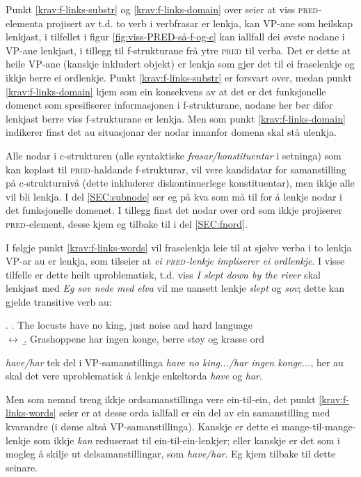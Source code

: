 \documentclass[11pt,a4paper,oneside,draft]{book}
\newcommand{\F}[2]{\textsc{#1}\ensuremath{_{#2}}}
\newcommand{\PRED}{\F{pred}{}}
\begin{document}
Punkt \ref{krav:f-links-substr} og \ref{krav:f-links-domain} over seier at viss
\PRED{}-elementa projisert av t.d. to verb i verbfrasar er lenkja, kan
VP-ane som heilskap lenkjast, i tilfellet i figur
\ref{fig:viss-PRED-så-f-og-c} kan iallfall dei øvste nodane i VP-ane
lenkjast, i tillegg til f-strukturane frå ytre \PRED{} til verba.  Det er
dette at heile VP-ane (kanskje inkludert objekt) er lenkja som gjer
det til ei fraselenkje og ikkje berre ei ordlenkje. Punkt
\ref{krav:f-links-substr} er forsvart over, medan punkt
\ref{krav:f-links-domain} kjem som ein konsekvens av at det er det
funksjonelle domenet som spesifiserer informasjonen i f-strukturane,
nodane her bør difor lenkjast berre viss f-strukturane er lenkja. Men
som punkt \ref{krav:f-links-domain} indikerer finst det au situasjonar der
nodar innanfor domena skal stå ulenkja.

Alle nodar i c-strukturen (alle syntaktiske \emph{frasar/konstituentar} i
setninga) som kan koplast til \PRED{}-haldande f-strukturar, vil vere
kandidatar for samanstilling på c-strukturnivå (dette inkluderer
diskontinuerlege konstituentar), men ikkje alle vil bli lenkja.  I del
\ref{SEC:subnode} ser eg på kva som må til for å lenkje nodar i det
funksjonelle domenet.  I tillegg finst det nodar over ord som ikkje
projiserer \PRED{}-element, desse kjem eg tilbake til i del
\ref{SEC:fnord}.

I følgje punkt \ref{krav:f-links-words} vil fraselenkja leie til at sjølve
verba i to lenkja VP-ar au er lenkja, som tilseier at \emph{ei \PRED{}-lenkje
impliserer ei ordlenkje}. I visse tilfelle er dette heilt
uproblematisk, t.d. viss \emph{I slept down by the river} skal lenkjast med
\emph{Eg sov nede med elva} vil me uansett lenkje \emph{slept} og \emph{sov}; dette
kan gjelde transitive verb au:

\ex. \a. The locusts have no king, just noise and hard language\\
     $\leftrightarrow$
     \b. Grashoppene har ingen konge, berre støy og krasse ord


\emph{have/har} tek del i VP-samanstillinga \emph{have no king.../har
ingen konge...}, her au skal det vere uproblematisk å lenkje
enkeltorda \emph{have} og \emph{har}.

Men som nemnd treng ikkje ordsamanstillinga vere ein-til-ein, det
punkt \ref{krav:f-links-words} seier er at desse orda iallfall er ein del
av ein samanstilling med kvarandre (i døme \Last altså
VP-samanstillinga). Kanskje er dette ei mange-til-mange-lenkje som
ikkje \emph{kan} reduserast til ein-til-ein-lenkjer; eller kanskje er
det som i \Last mogleg å skilje ut delsamanstillingar, som
\emph{have/har}. Eg kjem tilbake til dette
 seinare.
\end{document}

